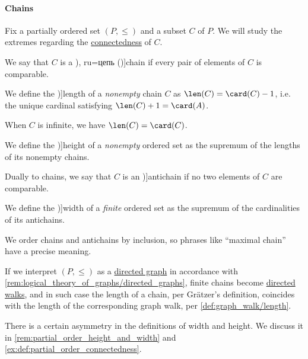 \paragraph{Chains}

\begin{definition}\label{def:partial_order_connectedness}
  Fix a partially ordered set \( (P, \leq) \) and a subset \( C \) of \( P \). We will study the extremes regarding the \hyperref[def:binary_relation/connected]{connectedness} of \( C \).

  \begin{thmenum}
     We say that \( C \) is a \term[bg=верига (\cite[10]{Проданов1982ФункционаленАнализЧаст1}), ru=цепь (\cite[def. 3.4]{Гуров2013ТеорияРешёток})]{chain} if every pair of elements of \( C \) is comparable.

    \mimprovised We define the \term[ru=длина (\cite[83]{Гуров2013ТеорияРешёток})]{length} of a \emph{nonempty} chain \( C \) as \( \len(C) = \card(C) - 1 \), i.e. the unique cardinal satisfying \( \len(C) + 1 = \card(A) \).

    When \( C \) is infinite, we have \( \len(C) = \card(C) \).

    \mimprovised We define the \term[ru=высота (\cite[83]{Гуров2013ТеорияРешёток})]{height} of a \emph{nonempty} ordered set as the supremum of the lengths of its nonempty chains.

     Dually to chains, we say that \( C \) is an \term[ru=антицепь (\cite[78]{Гуров2013ТеорияРешёток})]{antichain} if no two elements of \( C \) are comparable.

     We define the \term[ru=ширина (\cite[83]{Гуров2013ТеорияРешёток})]{width} of a \emph{finite} ordered set as the supremum of the cardinalities of its antichains.
  \end{thmenum}
\end{definition}
\begin{comments}
  \item We order chains and antichains by inclusion, so phrases like \enquote{maximal chain} have a precise meaning.

  \item If we interpret \( (P, \leq) \) as a \hyperref[def:directed_graph]{directed graph} in accordance with \cref{rem:logical_theory_of_graphs/directed_graphs}, finite chains become \hyperref[def:graph_walk/directed]{directed walks}, and in such case the length of a chain, per Gr\"atzer's definition, coincides with the length of the corresponding graph walk, per \cref{def:graph_walk/length}.

  \item There is a certain asymmetry in the definitions of width and height. We discuss it in \cref{rem:partial_order_height_and_width} and \cref{ex:def:partial_order_connectedness}.
\end{comments}

